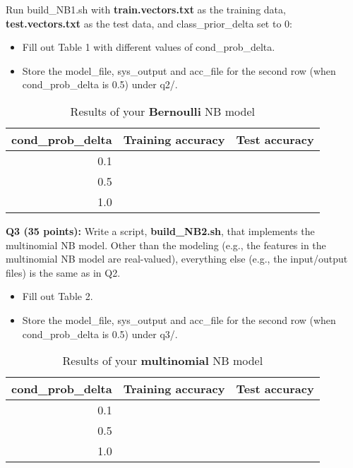 \documentclass[11pt]{article}
\begin{document}
 Run build\_NB1.sh with {\bf train.vectors.txt} as the 
training data, {\bf test.vectors.txt} as the test data,
and class\_prior\_delta set to 0:
\begin{itemize}
\item Fill out Table 1 with different values of cond\_prob\_delta.
\item Store the model\_file, sys\_output
and acc\_file for the second row (when cond\_prob\_delta is 0.5) under
q2/.
\end{itemize}


\begin{table}[h]
\centering
\caption{Results of your {\bf Bernoulli} NB model}
\label{table1}
\begin{tabular}{|r|l|l|} \hline
cond\_prob\_delta   & Training accuracy & Test accuracy \\ \hline
0.1       &  &    \\ \hline
0.5       &  &    \\ \hline
1.0      &  &    \\ \hline
\end{tabular}
\end{table}


\vspace{0.4 in}

\hspace{-0.3in}
{\bf Q3 (35 points):} Write a script, {\bf build\_NB2.sh}, 
  that implements the multinomial NB model. Other than the modeling
  (e.g., the features in the multinomial NB model are real-valued),
  everything else (e.g., the input/output files) is the same as in Q2.
  \begin{itemize}
  \item  Fill out Table 2.
  \item Store the model\_file, sys\_output
and acc\_file for the second row (when cond\_prob\_delta is 0.5) under
q3/.
  \end{itemize}
  

\begin{table}[h]
\centering
\caption{Results of your {\bf multinomial} NB model}
\label{table1}
\begin{tabular}{|r|l|l|} \hline
cond\_prob\_delta   & Training accuracy & Test accuracy \\ \hline
0.1       &  &    \\ \hline
0.5       &  &    \\ \hline
1.0     &  &    \\ \hline
\end{tabular}
\end{table}
\end{document}
